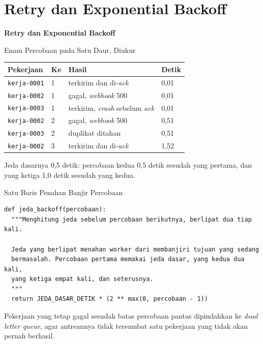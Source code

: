 \documentclass[aspectratio=169, table, 12pt]{beamer}
\begin{document}
\section{Retry dan Exponential Backoff}

\begin{frame}{\hfill}
  \centering
  \Huge{\textbf{Retry dan Exponential Backoff}}
\end{frame}

\begin{frame}{{\Large Enam Percobaan pada Satu Daur, Diukur}}
  \vspace{6pt}
  \centering
  {\footnotesize
  \begin{tabularx}{\textwidth}{llYl}
    \hline
    \textbf{Pekerjaan} & \textbf{Ke} & \textbf{Hasil} & \textbf{Detik} \\
    \hline
    \texttt{kerja-0001} & 1 & terkirim dan di-\textit{ack} & 0,01 \\
    \hline
    \texttt{kerja-0002} & 1 & gagal, \textit{webhook} 500 & 0,01 \\
    \hline
    \texttt{kerja-0003} & 1 & terkirim, \textit{crash} sebelum \textit{ack} & 0,01 \\
    \hline
    \texttt{kerja-0002} & 2 & gagal, \textit{webhook} 500 & 0,51 \\
    \hline
    \texttt{kerja-0003} & 2 & duplikat ditahan & 0,51 \\
    \hline
    \texttt{kerja-0002} & 3 & terkirim dan di-\textit{ack} & 1,52 \\
    \hline
  \end{tabularx}}

  \vspace{6pt}
  {\small Jeda dasarnya 0,5 detik: percobaan kedua 0,5 detik sesudah yang
  pertama, dan yang ketiga 1,0 detik sesudah yang kedua.}
\end{frame}

\begin{frame}[fragile]{{\Large Satu Baris Penahan Banjir Percobaan}}
  \vspace{2pt}
\begin{lstlisting}[style=PythonStyle]
def jeda_backoff(percobaan):
  """Menghitung jeda sebelum percobaan berikutnya, berlipat dua tiap kali.

  Jeda yang berlipat menahan worker dari membanjiri tujuan yang sedang
  bermasalah. Percobaan pertama memakai jeda dasar, yang kedua dua kali,
  yang ketiga empat kali, dan seterusnya.
  """
  return JEDA_DASAR_DETIK * (2 ** max(0, percobaan - 1))
\end{lstlisting}
  \vspace{2pt}
  {\small Pekerjaan yang tetap gagal sesudah batas percobaan pantas
  dipindahkan ke \textit{dead letter queue}, agar antreannya tidak tersumbat
  satu pekerjaan yang tidak akan pernah berhasil.}
\end{frame}
\end{document}
